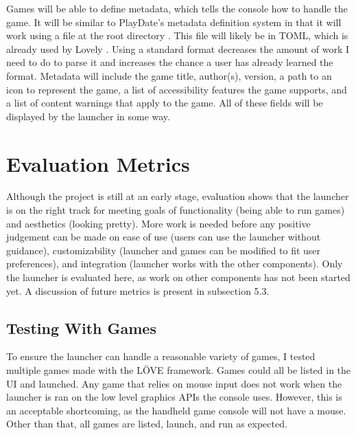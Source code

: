 \documentclass[10pt,twocolumn]{article}
\begin{document}
Games will be able to define metadata, which tells the console how to handle the
game. It will be similar to PlayDate's metadata definition system in that it
will work using a file at the root directory \cite{inc_inside_nodate}. This file
will likely be in TOML, which is already used by Lovely
\cite{green_ethangreen-devlovely-injector_2025}. Using a standard format
decreases the amount of work I need to do to parse it and increases the chance a
user has already learned the format. Metadata will include the game title,
author(s), version, a path to an icon to represent the game,
a list of accessibility features the game supports, and a list of content
warnings that apply to the game. All of these fields will be displayed by the
launcher in some way.


\section{Evaluation Metrics}

Although the project is still at an early stage, evaluation shows that the
launcher is on the right track for meeting goals of functionality
(being able to run games) and aesthetics (looking pretty). More work is needed
before any positive judgement can be made on ease of use (users can use the
launcher without guidance), customizability (launcher and games can be
modified to fit user preferences), and integration (launcher works with the
other components). Only the launcher is evaluated here, as work on other
components has not been started yet. A discussion of future metrics is present
in subsection 5.3.

\subsection{Testing With Games}

To ensure the launcher can handle a reasonable variety of games, I tested
multiple games made with the LÖVE framework.
Games could all be listed in the UI
and launched. Any game that relies on mouse input does not work when the
launcher is ran on the low level graphics APIs the console uses. However, this
is an acceptable shortcoming, as the handheld game console will not have a
mouse. Other than that, all games are listed, launch, and run as expected.
\end{document}
